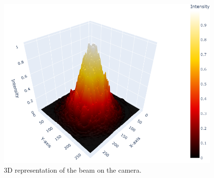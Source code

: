 \documentclass[prl,twocolumn]{revtex4-1}
\begin{document}
\begin{figure}[!t]
    \centering
    \includegraphics[width=1\linewidth]{Images/3d_example.png}
    \caption{3D representation of the beam on the camera.}
    \label{fig:3d_example}
\end{figure}
\end{document}
